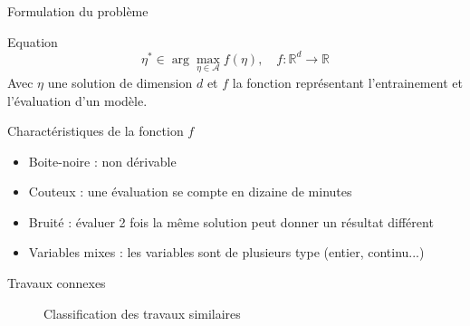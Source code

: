 \begin{frame}{Formulation du problème}
    \begin{block}{Equation}
        \begin{equation}
            \eta^* \in \arg \max_{\eta \in \mathcal A}f(\eta), \quad f:\mathbb{R}^d \rightarrow \mathbb{R}
        \end{equation}
        Avec $\eta$ une solution de dimension $d$ et $f$ la fonction représentant l'entrainement et l'évaluation d'un modèle.
    \end{block}

    \begin{block}{Charactéristiques de la fonction $f$}
        \begin{itemize}
            \item Boite-noire : non dérivable
            \item Couteux : une évaluation se compte en dizaine de minutes
            \item Bruité : évaluer 2 fois la même solution peut donner un résultat différent
            \item Variables mixes : les variables sont de plusieurs type (entier, continu...)
        \end{itemize}
        
    \end{block}
    
   
\end{frame}

\begin{frame}{Travaux connexes}
    \begin{figure}
        \centering
        
        \caption{Classification des travaux similaires}
   \end{figure} 
   
\end{frame}